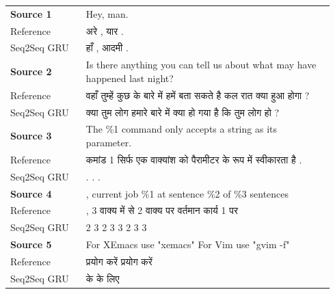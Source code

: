 \begin{longtable}{p{0.22\linewidth}p{0.72\linewidth}}
\toprule
\textbf{Source 1} & Hey, man. \\
Reference & {\hindifont अरे , यार .} \\
Seq2Seq GRU & {\hindifont हाँ , आदमी .} \\
\midrule
\textbf{Source 2} & Is there anything you can tell us about what may have happened last night? \\
Reference & {\hindifont वहाँ तुम्हें कुछ के बारे में हमें बता सकते है कल रात क्या हुआ होगा ?} \\
Seq2Seq GRU & {\hindifont क्या तुम लोग हमारे बारे में क्या हो गया है कि तुम लोग हो ?} \\
\midrule
\textbf{Source 3} & The \%1 command only accepts a string as its parameter. \\
Reference & {\hindifont कमांड 1 सिर्फ एक वाक्यांश को पैरामीटर के रूप में स्वीकारता है .} \\
Seq2Seq GRU & {\hindifont . . .} \\
\midrule
\textbf{Source 4} & , current job \%1 at sentence \%2 of \%3 sentences \\
Reference & {\hindifont , 3 वाक्य में से 2 वाक्य पर वर्तमान कार्य 1 पर} \\
Seq2Seq GRU & {\hindifont 1 2 3 2 3 3 2 3 3} \\
\midrule
\textbf{Source 5} & For XEmacs use "xemacs" For Vim use "gvim -f" \\
Reference & {\hindifont प्रयोग करें प्रयोग करें} \\
Seq2Seq GRU & {\hindifont के के लिए} \\
\midrule
\bottomrule
\end{longtable}
